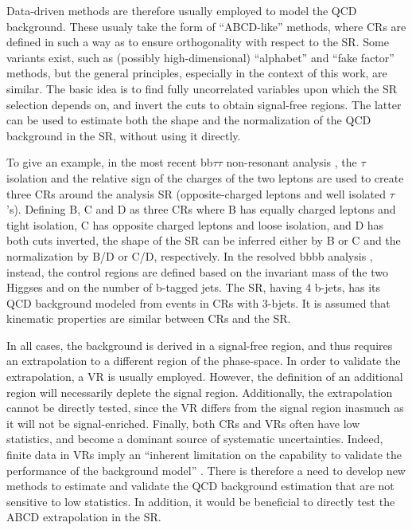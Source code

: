 \documentclass[11pt]{article}
\newcommand{\bbbb}{bbbb}
\newcommand{\bbtt}{bb$\tau\tau$}
\begin{document}
\begin{enumerate}
Data-driven methods are therefore usually employed to model the \ac{QCD} background.
These usualy take the form of ``ABCD-like'' methods, where \acp{CR} are defined in such a way as to ensure orthogonality with respect to the \ac{SR}.
Some variants exist, such as (possibly high-dimensional) ``alphabet'' \cite{corcodilos_thesis} and ``fake factor'' \cite{fake_factor_method,higgs_bbtautau_hy} methods, but the general principles, especially in the context of this work, are similar.
The basic idea is to find fully uncorrelated variables upon which the \ac{SR} selection depends on, and invert the cuts to obtain signal-free regions.
The latter can be used to estimate both the shape and the normalization of the \ac{QCD} background in the \ac{SR}, without using it directly.

To give an example, in the most recent \bbtt{} non-resonant analysis \cite{higgs_bbtautau_nonres}, the \(\tau\) isolation and the relative sign of the charges of the two leptons are used to create three \acp{CR} around the analysis \ac{SR} (opposite-charged leptons and well isolated \(\tau\)'s). Defining B, C and D as three \acp{CR} where B has equally charged leptons and tight isolation, C has opposite charged leptons and loose isolation, and D has both cuts inverted, the shape of the \ac{SR} can be inferred either by B or C and the normalization by B/D or C/D, respectively.
In the resolved \bbbb{} analysis \cite{bbbb_resolved_cms}, instead, the control regions are defined based on the invariant mass of the two Higgses and on the number of b-tagged jets.
The \ac{SR}, having 4 b-jets, has its \ac{QCD} background modeled from events in \acp{CR} with 3-bjets.
It is assumed that kinematic properties are similar between \acp{CR} and the \ac{SR}. 

In all cases, the background is derived in a signal-free region, and thus requires an extrapolation to a different region of the phase-space.
In order to validate the extrapolation, a \ac{VR} is usually employed.
However, the definition of an additional region will necessarily deplete the signal region.
Additionally, the extrapolation cannot be directly tested, since the \ac{VR} differs from the signal region inasmuch as it will not be signal-enriched.
Finally, both \acp{CR} and \acp{VR} often have low statistics, and become a dominant source of systematic uncertainties.
Indeed, finite data in \acp{VR} imply an ``inherent limitation on the capability to validate the performance of the background model'' \cite{zz_zh_bbbb}.
There is therefore a need to develop new methods to estimate and validate the \ac{QCD} background estimation that are not sensitive to low statistics.
In addition, it would be beneficial to directly test the ABCD extrapolation in the \ac{SR}.



\end{enumerate}
\end{document}
